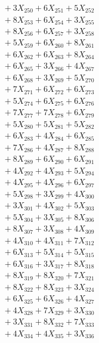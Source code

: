 \documentclass[a4paper,10pt]{article}
\begin{document}
{\begin{align}
&\;  + 3 X_{250} + 6 X_{251} + 5 X_{252} \\[0.3ex]
&\;  + 8 X_{253} + 6 X_{254} + 3 X_{255} \\[0.3ex]
&\;  + 8 X_{256} + 6 X_{257} + 3 X_{258} \\[0.3ex]
&\;  + 5 X_{259} + 6 X_{260} + 8 X_{261} \\[0.3ex]
&\;  + 6 X_{262} + 6 X_{263} + 8 X_{264} \\[0.3ex]
&\;  + 6 X_{265} + 3 X_{266} + 4 X_{267} \\[0.3ex]
&\;  + 6 X_{268} + 3 X_{269} + 5 X_{270} \\[0.3ex]
&\;  + 7 X_{271} + 6 X_{272} + 6 X_{273} \\[0.3ex]
&\;  + 5 X_{274} + 6 X_{275} + 6 X_{276} \\[0.3ex]
&\;  + 7 X_{277} + 7 X_{278} + 6 X_{279} \\[0.5ex]\allowbreak
&\;  + 5 X_{280} + 5 X_{281} + 5 X_{282} \\[0.3ex]
&\;  + 6 X_{283} + 4 X_{284} + 6 X_{285} \\[0.3ex]
&\;  + 7 X_{286} + 4 X_{287} + 8 X_{288} \\[0.3ex]
&\;  + 8 X_{289} + 6 X_{290} + 6 X_{291} \\[0.3ex]
&\;  + 4 X_{292} + 4 X_{293} + 5 X_{294} \\[0.3ex]
&\;  + 4 X_{295} + 4 X_{296} + 6 X_{297} \\[0.3ex]
&\;  + 5 X_{298} + 3 X_{299} + 4 X_{300} \\[0.3ex]
&\;  + 3 X_{301} + 4 X_{302} + 5 X_{303} \\[0.3ex]
&\;  + 5 X_{304} + 3 X_{305} + 8 X_{306} \\[0.3ex]
&\;  + 8 X_{307} + 3 X_{308} + 4 X_{309} \\[0.5ex]\allowbreak
&\;  + 4 X_{310} + 4 X_{311} + 7 X_{312} \\[0.3ex]
&\;  + 6 X_{313} + 5 X_{314} + 5 X_{315} \\[0.3ex]
&\;  + 6 X_{316} + 3 X_{317} + 8 X_{318} \\[0.3ex]
&\;  + 8 X_{319} + 8 X_{320} + 7 X_{321} \\[0.3ex]
&\;  + 8 X_{322} + 8 X_{323} + 3 X_{324} \\[0.3ex]
&\;  + 6 X_{325} + 6 X_{326} + 4 X_{327} \\[0.3ex]
&\;  + 4 X_{328} + 7 X_{329} + 3 X_{330} \\[0.3ex]
&\;  + 3 X_{331} + 8 X_{332} + 7 X_{333} \\[0.3ex]
&\;  + 4 X_{334} + 4 X_{335} + 3 X_{336} \\[0.3ex]

\end{align}}
\end{document}
